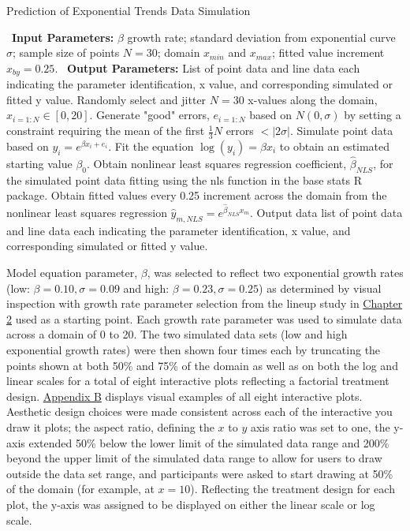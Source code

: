 \documentclass[print]{nuthesis}
\begin{document}
\begin{algorithm}
  \caption{Prediction of Exponential Trends Data Simulation}\label{alg:exponential-prediction-alg}
  \begin{algorithmic}[1]
    \Statex \textbullet~\textbf{Input Parameters:} $\beta$ growth rate; standard deviation from exponential curve $\sigma$; sample size of points $N = 30$; domain $x_{min}$ and $x_{max}$; fitted value increment $x_{by} = 0.25$.
    \Statex \textbullet~\textbf{Output Parameters:} List of point data and line data each indicating the parameter identification, x value, and corresponding simulated or fitted y value.
    \State Randomly select and jitter $N = 30$ x-values along the domain, $x_{i=1:N}\in [0, 20]$.
    \State Generate "good" errors, $e_{i = 1:N}$ based on $N(0,\sigma)$ by setting a constraint requiring the mean of the first $\frac{1}{3} N$ errors $< |2\sigma|.$
    \State Simulate point data based on $y_i = e^{\beta x_i + e_i}$.
    \State Fit the equation $\log(y_i) = \beta x_i$ to obtain an estimated starting value $\beta_0$. 
    \State Obtain nonlinear least squares regression coefficient, $\hat\beta_{NLS}$, for the simulated point data fitting using the nls function in the base stats R package.
    \State Obtain fitted values every 0.25 increment across the domain from the nonlinear least squares regression $\hat y_{m,NLS} = e^{\hat\beta_{NLS} x_m}$.
    \State Output data list of point data and line data each indicating the parameter identification, x value, and corresponding simulated or fitted y value.
  \end{algorithmic}
\end{algorithm}

Model equation parameter, \(\beta\), was selected to reflect two exponential growth rates (low: \(\beta = 0.10, \sigma = 0.09\) and high: \(\beta = 0.23, \sigma = 0.25\)) as determined by visual inspection with growth rate parameter selection from the lineup study in \protect\hyperlink{lineups-parameter-selection}{Chapter 2} used as a starting point.
Each growth rate parameter was used to simulate data across a domain of 0 to 20.
The two simulated data sets (low and high exponential growth rates) were then shown four times each by truncating the points shown at both 50\% and 75\% of the domain as well as on both the log and linear scales for a total of eight interactive plots reflecting a factorial treatment design.
\protect\hyperlink{exponential-prediction-plots}{Appendix B} displays visual examples of all eight interactive plots.
Aesthetic design choices were made consistent across each of the interactive you draw it plots; the aspect ratio, defining the \(x\) to \(y\) axis ratio was set to one, the y-axis extended 50\% below the lower limit of the simulated data range and 200\% beyond the upper limit of the simulated data range to allow for users to draw outside the data set range, and participants were asked to start drawing at 50\% of the domain (for example, at \(x = 10\)).
Reflecting the treatment design for each plot, the y-axis was assigned to be displayed on either the linear scale or log scale.
\end{document}

